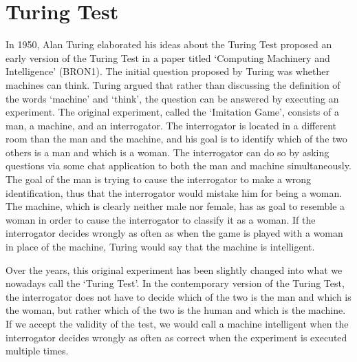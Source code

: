 \section{Turing Test}
In 1950, Alan Turing elaborated his ideas about the Turing Test proposed an early version of the Turing Test in a paper titled ‘Computing Machinery and Intelligence’ (BRON1). The initial question proposed by Turing was whether machines can think. Turing argued that rather than discussing the definition of the words ‘machine’ and ‘think’, the question can be answered by executing an experiment. The original experiment, called the ‘Imitation Game’, consists of a man, a machine, and an interrogator. The interrogator is located in a different room than the man and the machine, and his goal is to identify which of the two others is a man and which is a woman. The interrogator can do so by asking questions via some chat application to both the man and machine simultaneously. The goal of the man is trying to cause the interrogator to make a wrong identification, thus that the interrogator would mistake him for being a woman. The machine, which is clearly neither male nor female, has as goal to resemble a woman in order to cause the interrogator to classify it as a woman. If the interrogator decides wrongly as often as when the game is played with a woman in place of the machine, Turing would say that the machine is intelligent.

Over the years, this original experiment has been slightly changed into what we nowadays call the ‘Turing Test’. In the contemporary version of the Turing Test, the interrogator does not have to decide which of the two is the man and which is the woman, but rather which of the two is the human and which is the machine. If we accept the validity of the test, we would call a machine intelligent when the interrogator decides wrongly as often as correct when the experiment is executed multiple times.
